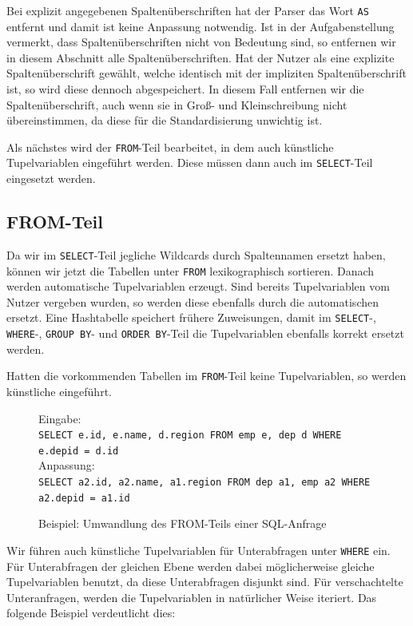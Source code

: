 Bei explizit angegebenen Spaltenüberschriften hat der Parser das Wort \verb|AS| entfernt und damit ist keine Anpassung notwendig. Ist in der Aufgabenstellung vermerkt, dass Spaltenüberschriften nicht von Bedeutung sind, so entfernen wir in diesem Abschnitt alle Spaltenüberschriften. Hat der Nutzer als eine explizite Spaltenüberschrift gewählt, welche identisch mit der impliziten Spaltenüberschrift ist, so wird diese dennoch abgespeichert. In diesem Fall entfernen wir die Spaltenüberschrift, auch wenn sie in Groß- und Kleinschreibung nicht übereinstimmen, da diese für die Standardisierung unwichtig ist.

Als nächstes wird der \verb|FROM|-Teil bearbeitet, in dem auch künstliche Tupelvariablen eingeführt werden. Diese müssen dann auch im \verb|SELECT|-Teil eingesetzt werden.

\subsection{FROM-Teil}
\label{subsec:from}

Da wir im \verb|SELECT|-Teil jegliche Wildcards durch Spaltennamen ersetzt haben, können wir jetzt die Tabellen unter \verb|FROM| lexikographisch sortieren. Danach werden automatische Tupelvariablen erzeugt. Sind bereits Tupelvariablen vom Nutzer vergeben wurden, so werden diese ebenfalls durch die automatischen ersetzt. Eine Hashtabelle speichert frühere Zuweisungen, damit im \verb|SELECT|-, \verb|WHERE|-, \verb|GROUP BY|- und \verb|ORDER BY|-Teil die Tupelvariablen ebenfalls korrekt ersetzt werden.

Hatten die vorkommenden Tabellen im \verb|FROM|-Teil keine Tupelvariablen, so werden künstliche eingeführt.

\begin{figure}[h]
Eingabe: \\\verb|SELECT e.id, e.name, d.region FROM emp e, dep d WHERE e.depid = d.id|\\

Anpassung: \\\verb|SELECT a2.id, a2.name, a1.region FROM dep a1, emp a2 WHERE a2.depid = a1.id|\\
\caption{Beispiel: Umwandlung des FROM-Teils einer SQL-Anfrage}
\end{figure}

Wir führen auch künstliche Tupelvariablen für Unterabfragen unter \verb|WHERE| ein. Für Unterabfragen der gleichen Ebene werden dabei möglicherweise gleiche Tupelvariablen benutzt, da diese Unterabfragen disjunkt sind. Für verschachtelte Unteranfragen, werden die Tupelvariablen in natürlicher Weise iteriert. Das folgende Beispiel verdeutlicht dies:

